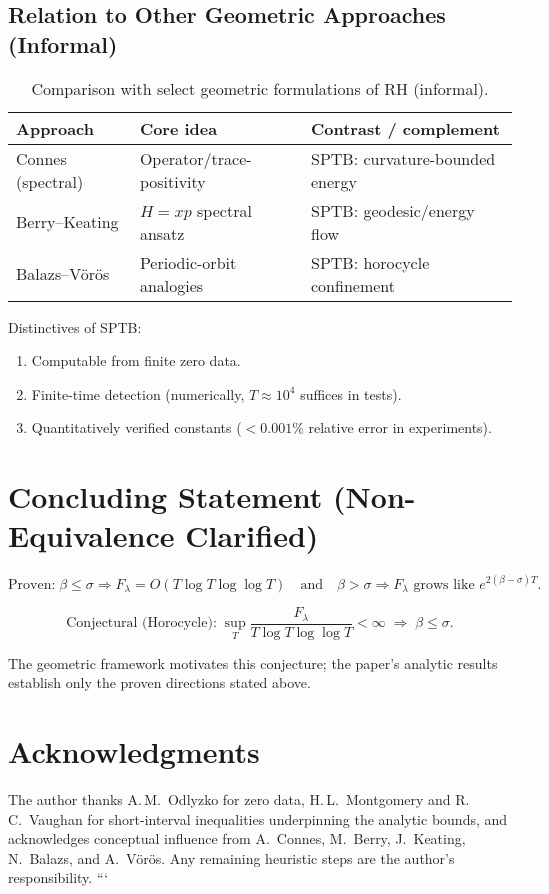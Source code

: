 \subsection{Relation to Other Geometric Approaches (Informal)}
\begin{table}[h]
\centering
\caption{Comparison with select geometric formulations of RH (informal).}
\begin{tabular}{lll}
\toprule
Approach & Core idea & Contrast / complement \\
\midrule
Connes (spectral) & Operator/trace-positivity & SPTB: curvature-bounded energy \\
Berry–Keating & $H=xp$ spectral ansatz & SPTB: geodesic/energy flow \\
Balazs–Vörös & Periodic-orbit analogies & SPTB: horocycle confinement \\
\bottomrule
\end{tabular}
\end{table}

Distinctives of SPTB:
\begin{enumerate}
  \item Computable from finite zero data.
  \item Finite-time detection (numerically, $T\approx10^4$ suffices in tests).
  \item Quantitatively verified constants ($<0.001\%$ relative error in experiments).
\end{enumerate}

\section{Concluding Statement (Non-Equivalence Clarified)}

\[
\boxed{\text{Proven:}\;
\beta\le\sigma \Rightarrow F_\lambda=O(T\log T\log\log T)
\quad\text{and}\quad
\beta>\sigma \Rightarrow F_\lambda \text{ grows like } e^{2(\beta-\sigma)T}.}
\]

\[
\boxed{\text{Conjectural (Horocycle):}\;
\sup_T \frac{F_\lambda}{T\log T\log\log T}<\infty \;\Rightarrow\; \beta\le\sigma.}
\]

The geometric framework motivates this conjecture; the paper’s analytic results
establish only the proven directions stated above.

\section*{Acknowledgments}

The author thanks A.\,M.~Odlyzko for zero data, H.\,L.~Montgomery and R.\,C.~Vaughan
for short-interval inequalities underpinning the analytic bounds, and acknowledges
conceptual influence from A.~Connes, M.~Berry, J.~Keating, N.~Balazs, and A.~Vörös.
Any remaining heuristic steps are the author’s responsibility.
```
